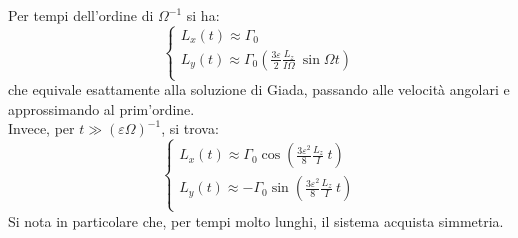 \documentclass[../main.tex]{subfiles}
\begin{document}
Per tempi dell'ordine di $\Omega^{-1}$ si ha: 
\begin{equation*}
\begin{cases}
		\displaystyle L_x(t)\approx \Gamma_0 \\
                     \displaystyle L_y(t)\approx \Gamma_0  \left(\frac{3\varepsilon }{2} \frac{L_z}{I\Omega}  \ {\sin \Omega t} \right) \\
	\end{cases}
\end{equation*}
che equivale esattamente alla soluzione di Giada, passando alle velocità angolari e approssimando al prim'ordine.  \\ Invece, per $t\gg (\varepsilon\Omega)^{-1}$, si trova:
\begin{equation*}
\begin{cases}
		\displaystyle L_x(t)\approx\Gamma_0 \cos \left(\frac{3\varepsilon^2 }{8} \frac{L_z}{I}\  t\right) \\
                     \displaystyle L_y(t)\approx-\Gamma_0 \sin \left(\frac{3\varepsilon^2 }{8} \frac{L_z}{I} \ t\right) \\
	\end{cases}
\end{equation*}
Si nota in particolare che, per tempi molto lunghi, il sistema acquista simmetria.
\end{document}

